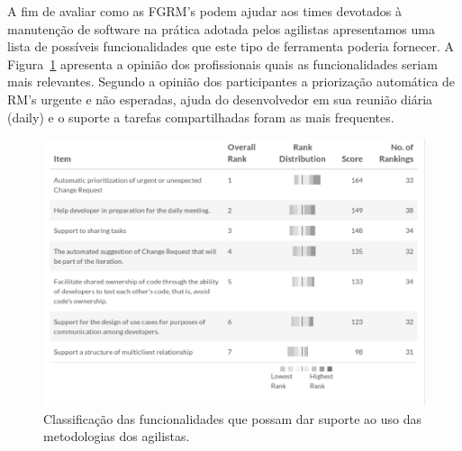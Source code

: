 A fim de avaliar como as FGRM's podem ajudar aos times devotados à manutenção de
software na prática adotada pelos agilistas apresentamos uma lista de possíveis
funcionalidades que este tipo de ferramenta poderia fornecer. A
Figura~\ref{fig:grafico_melhorias_fgrm_suporte_particas_ageis} apresenta a
opinião dos profissionais quais as funcionalidades seriam mais relevantes.
Segundo a opinião dos participantes a priorização automática de RM's urgente e
não esperadas, ajuda do desenvolvedor em sua reunião diária (daily) e o suporte
a tarefas compartilhadas foram as mais frequentes. 

\begin{figure}[htpb]
	\centering
	\includegraphics[width=0.8\linewidth]{./chapter-pesquisa-com-profissionais/img/grafico_melhorias_fgrm_suporte_particas_ageis.pdf}
	\caption{Classificação das funcionalidades que possam dar suporte ao uso das
	metodologias dos agilistas.}
	\label{fig:grafico_melhorias_fgrm_suporte_particas_ageis}
\end{figure}




